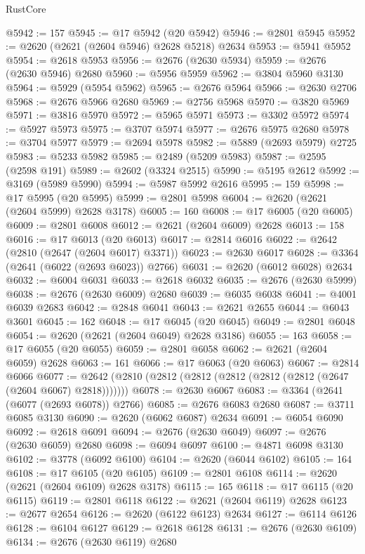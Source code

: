 \begin{lexlean}{RustCore}
\begin{coremodule}
@5942 := 157
@5945 := @17 @5942 (@20 @5942)
@5946 := @2801 @5945
@5952 := @2620 (@2621 (@2604 @5946) @2628 @5218) @2634
@5953 := @5941 @5952
@5954 := @2618 @5953
@5956 := @2676 (@2630 @5934)
@5959 := @2676 (@2630 @5946) @2680
@5960 := @5956 @5959
@5962 := @3804 @5960 @3130
@5964 := @5929 (@5954 @5962)
@5965 := @2676 @5964
@5966 := @2630 @2706
@5968 := @2676 @5966 @2680
@5969 := @2756 @5968
@5970 := @3820 @5969
@5971 := @3816 @5970
@5972 := @5965 @5971
@5973 := @3302 @5972
@5974 := @5927 @5973
@5975 := @3707 @5974
@5977 := @2676 @5975 @2680
@5978 := @3704 @5977
@5979 := @2694 @5978
@5982 := @5889 (@2693 @5979) @2725
@5983 := @5233 @5982
@5985 := @2489 (@5209 @5983)
@5987 := @2595 (@2598 @191)
@5989 := @2602 (@3324 @2515)
@5990 := @5195 @2612
@5992 := @3169 (@5989 @5990)
@5994 := @5987 @5992 @2616
@5995 := 159
@5998 := @17 @5995 (@20 @5995)
@5999 := @2801 @5998
@6004 := @2620 (@2621 (@2604 @5999) @2628 @3178)
@6005 := 160
@6008 := @17 @6005 (@20 @6005)
@6009 := @2801 @6008
@6012 := @2621 (@2604 @6009) @2628
@6013 := 158
@6016 := @17 @6013 (@20 @6013)
@6017 := @2814 @6016
@6022 := @2642 (@2810 (@2647 (@2604 @6017) @3371))
@6023 := @2630 @6017
@6028 := @3364 (@2641 (@6022 (@2693 @6023)) @2766)
@6031 := @2620 (@6012 @6028) @2634
@6032 := @6004 @6031
@6033 := @2618 @6032
@6035 := @2676 (@2630 @5999)
@6038 := @2676 (@2630 @6009) @2680
@6039 := @6035 @6038
@6041 := @4001 @6039 @2683
@6042 := @2848 @6041
@6043 := @2621 @2655
@6044 := @6043 @3601
@6045 := 162
@6048 := @17 @6045 (@20 @6045)
@6049 := @2801 @6048
@6054 := @2620 (@2621 (@2604 @6049) @2628 @3186)
@6055 := 163
@6058 := @17 @6055 (@20 @6055)
@6059 := @2801 @6058
@6062 := @2621 (@2604 @6059) @2628
@6063 := 161
@6066 := @17 @6063 (@20 @6063)
@6067 := @2814 @6066
@6077 := @2642 (@2810 (@2812 (@2812 (@2812 (@2812 (@2812 (@2647 (@2604 @6067) @2818)))))))
@6078 := @2630 @6067
@6083 := @3364 (@2641 (@6077 (@2693 @6078)) @2766)
@6085 := @2676 @6083 @2680
@6087 := @3711 @6085 @3130
@6090 := @2620 (@6062 @6087) @2634
@6091 := @6054 @6090
@6092 := @2618 @6091
@6094 := @2676 (@2630 @6049)
@6097 := @2676 (@2630 @6059) @2680
@6098 := @6094 @6097
@6100 := @4871 @6098 @3130
@6102 := @3778 (@6092 @6100)
@6104 := @2620 (@6044 @6102)
@6105 := 164
@6108 := @17 @6105 (@20 @6105)
@6109 := @2801 @6108
@6114 := @2620 (@2621 (@2604 @6109) @2628 @3178)
@6115 := 165
@6118 := @17 @6115 (@20 @6115)
@6119 := @2801 @6118
@6122 := @2621 (@2604 @6119) @2628
@6123 := @2677 @2654
@6126 := @2620 (@6122 @6123) @2634
@6127 := @6114 @6126
@6128 := @6104 @6127
@6129 := @2618 @6128
@6131 := @2676 (@2630 @6109)
@6134 := @2676 (@2630 @6119) @2680

\end{coremodule}
\end{lexlean}
